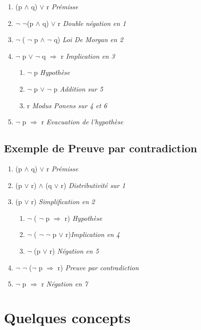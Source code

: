 \begin{enumerate}
\item (p $\land$ q) $\lor$ r  \textit{Prémisse}
\item $\lnot$ $\lnot$(p $\land$ q) $\lor$ r \textit{Double négation en 1}
\item $\lnot$ ( $\lnot$ p $\land$ $\lnot$ q) \textit{Loi De Morgan en 2}
\item $\lnot$ p $\lor$ $\lnot$ q $\Rightarrow$ r \textit{Implication en 3}

\begin{enumerate}
 \item  $\lnot$ p \textit{Hypothèse}
 \item  $\lnot$ p $\lor$ $\lnot$ p \textit{ Addition sur 5}
 \item  r \textit{ Modus Ponens sur 4 et 6}
\end{enumerate}

\item  $\lnot$ p $\Rightarrow$ r \textit{Evacuation de l'hypothèse}
\end{enumerate}

\section{Exemple de Preuve par contradiction}

\begin{enumerate}
\item  (p $\land$ q) $\lor$ r  \textit{Prémisse}
\item  (p  $\lor$ r) $\land$ (q $\lor$ r) \textit{Distributivité sur 1}
\item  (p $\lor$ r)  \textit{Simplification en 2}

\begin{enumerate}
 \item $\lnot$ ( $\lnot$ p $\Rightarrow$ r)  \textit{Hypothèse}
 \item $\lnot$ ( $\lnot$ $\lnot$ p $\lor$ r)\textit{Implication en 4}
 \item $\lnot$ (p $\lor$ r) \textit{ Négation en 5}
\end{enumerate}

\item $\lnot$ $\lnot$ ($\lnot$ p $\Rightarrow$ r)  \textit{ Preuve par contradiction}
\item $\lnot$ p $\Rightarrow$ r \textit{Négation en 7}
\end{enumerate}


\chapter{Quelques concepts}
